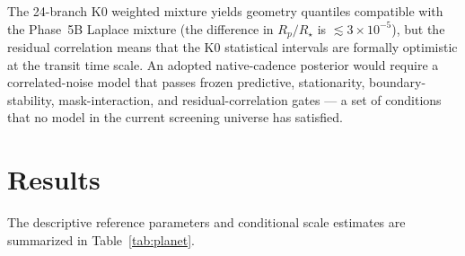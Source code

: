 \documentclass[11pt]{article}
\begin{document}
The 24-branch K0 weighted mixture yields geometry quantiles
compatible with the Phase~5B Laplace mixture (the difference in
$R_p/R_\star$ is $\lesssim 3\times10^{-5}$), but the residual correlation
means that the K0 statistical intervals are formally optimistic at the
transit time scale.  An adopted native-cadence posterior would require a
correlated-noise model that passes frozen predictive, stationarity,
boundary-stability, mask-interaction, and residual-correlation gates --- a
set of conditions that no model in the current screening universe has
satisfied.

\section{Results}

The descriptive reference parameters and conditional scale estimates are summarized
in Table~\ref{tab:planet}.
\end{document}
